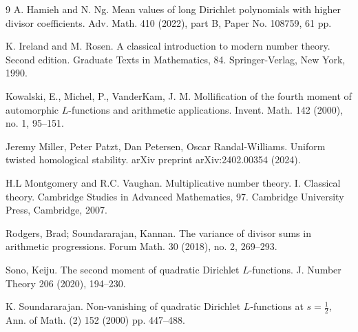 \documentclass[12pt]{amsart}
\begin{document}
\begin{thebibliography}{9}
		A. Hamieh and N. Ng. Mean values of long Dirichlet polynomials with higher divisor coefficients. Adv. Math. 410 (2022), part B, Paper No. 108759, 61 pp.
		
		K. Ireland and M. Rosen. A classical introduction to modern number theory. Second edition. Graduate Texts in Mathematics, 84. Springer-Verlag, New York, 1990.
		
		Kowalski, E., Michel, P., VanderKam, J. M. Mollification of the fourth moment of automorphic $L$-functions and arithmetic applications. Invent. Math. 142 (2000), no. 1, 95--151.
		
		 Jeremy Miller, Peter Patzt, Dan Petersen, Oscar Randal-Williams. Uniform twisted homological stability. arXiv preprint arXiv:2402.00354 (2024).
		
		H.L Montgomery and R.C. Vaughan. Multiplicative number theory. I. Classical theory. Cambridge Studies in Advanced Mathematics, 97. Cambridge University Press, Cambridge, 2007. 
		
		 Rodgers, Brad; Soundararajan, Kannan. The variance of divisor sums in arithmetic progressions. Forum Math. 30 (2018), no. 2, 269--293.
		
		 Sono, Keiju. The second moment of quadratic Dirichlet $L$-functions. J. Number Theory 206 (2020), 194--230.
		
		K. Soundararajan.  Non-vanishing of
		quadratic Dirichlet $L$-functions at $s=\frac12$,    Ann. of Math.
		(2)   152   (2000)  pp. 447--488.
		
		
		
		
	\end{thebibliography}
	
	
\end{document}
